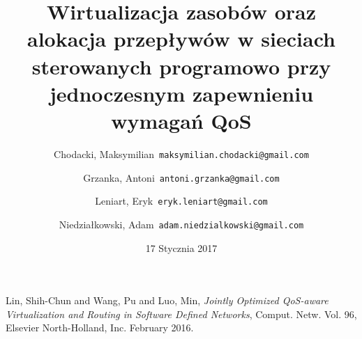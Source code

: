 \documentclass{article}
\title{Wirtualizacja zasobów oraz alokacja przepływów w sieciach sterowanych programowo przy jednoczesnym zapewnieniu wymagań QoS}
\author{
  Chodacki, Maksymilian\      \texttt{maksymilian.chodacki@gmail.com}
  \and
  Grzanka, Antoni\      \texttt{antoni.grzanka@gmail.com}
  \and
  Leniart, Eryk\      \texttt{eryk.leniart@gmail.com}
  \and
  Niedziałkowski, Adam\      \texttt{adam.niedzialkowski@gmail.com}
}
\date{17 Stycznia 2017}
\begin{document}
\maketitle









\begin{thebibliography}

  Lin, Shih-Chun and Wang, Pu and Luo, Min,
  \emph{Jointly Optimized QoS-aware Virtualization and Routing in Software Defined Networks},
  Comput. Netw. Vol. 96,
  Elsevier North-Holland, Inc.
  February 2016.

\end{thebibliography}
\end{document}
